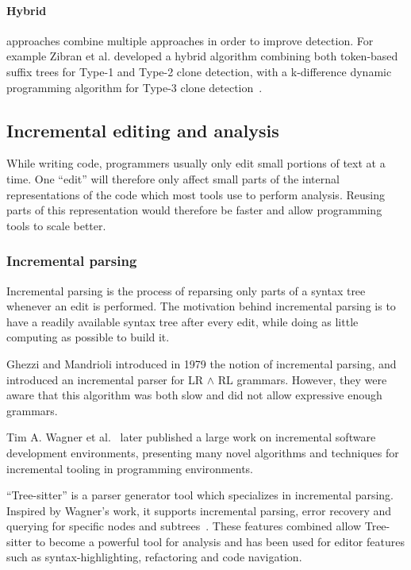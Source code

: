 \paragraph{Hybrid} approaches combine multiple approaches in order to improve detection.
For example Zibran et al. developed a hybrid algorithm combining both token-based suffix
trees for Type-1 and Type-2 clone detection, with a k-difference dynamic programming
algorithm for Type-3 clone detection~\cite{Zibran_real_time_search}.

\subsection{Incremental editing and analysis}

While writing code, programmers usually only edit small portions of text at a time. One
``edit'' will therefore only affect small parts of the internal representations of the
code which most tools use to perform analysis. Reusing parts of this representation would
therefore be faster and allow programming tools to scale better.

\subsubsection{Incremental parsing}

Incremental parsing is the process of reparsing only parts of a syntax tree whenever an
edit is performed. The motivation behind incremental parsing is to have a readily
available syntax tree after every edit, while doing as little computing as possible to
build it.

Ghezzi and Mandrioli introduced in 1979 the notion of incremental parsing, and
introduced an incremental parser for LR $\land$ RL grammars. However, they were aware that
this algorithm was both slow and did not allow expressive enough
grammars.~\cite{IncrementalParsing}

Tim A. Wagner et al.~\cite{PracticalAlgorithmsForIncremental} later published a large work
on incremental software development environments, presenting many novel algorithms and
techniques for incremental tooling in programming environments.

``Tree-sitter'' is a parser generator tool which specializes in incremental parsing.
Inspired by Wagner's work, it supports incremental parsing, error recovery and querying
for specific nodes and subtrees~\cite{treesitter}. These features combined allow
Tree-sitter to become a powerful tool for analysis and has been used for editor features
such as syntax-highlighting, refactoring and code navigation.

